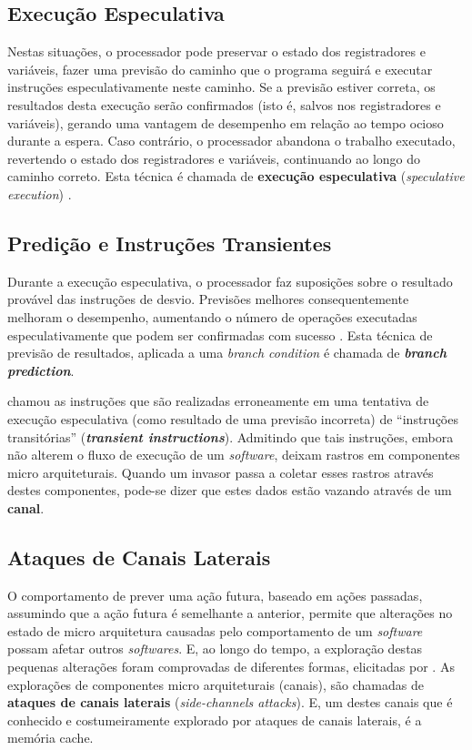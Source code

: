 \documentclass[conference]{IEEEtran}
\begin{document}
\subsection{Execução Especulativa}
Nestas situações, o processador pode preservar o estado dos registradores e variáveis, fazer uma previsão do caminho que o programa seguirá e executar instruções especulativamente neste caminho. Se a previsão estiver correta, os resultados desta execução serão confirmados (isto é, salvos nos registradores e variáveis), gerando uma vantagem de desempenho em relação ao tempo ocioso durante a espera. Caso contrário, o processador abandona o trabalho executado, revertendo o estado dos registradores e variáveis, continuando ao longo do caminho correto. Esta técnica é chamada de \textbf{execução especulativa} (\emph{speculative execution}) \cite{Kocher2018Spectre}.

\subsection{Predição e Instruções Transientes}
Durante a execução especulativa, o processador faz suposições sobre o resultado provável das instruções de desvio. Previsões melhores consequentemente melhoram o desempenho, aumentando o número de operações executadas especulativamente que podem ser confirmadas com sucesso \cite{Kocher2018Spectre}. Esta técnica de previsão de resultados, aplicada a uma \emph{branch condition} é chamada de \textbf{\emph{branch prediction}}.

 chamou as instruções que são realizadas erroneamente em uma tentativa de execução especulativa (como resultado de uma previsão incorreta) de ``instruções transitórias'' (\textbf{\emph{transient instructions}}). Admitindo que tais instruções, embora não alterem o fluxo de execução de um \emph{software}, deixam rastros em componentes micro arquiteturais. Quando um invasor passa a coletar esses rastros através destes componentes, pode-se dizer que estes dados estão vazando através de um \textbf{canal}.

\subsection{Ataques de Canais Laterais}
O comportamento de prever uma ação futura, baseado em ações passadas, assumindo que a ação futura é semelhante a anterior, permite que alterações no estado de micro arquitetura causadas pelo comportamento de um \emph{software} possam afetar outros \emph{softwares}. E, ao longo do tempo, a exploração destas pequenas alterações foram comprovadas de diferentes formas, elicitadas por . As explorações de componentes micro arquiteturais (canais), são chamadas de \textbf{ataques de canais laterais} (\emph{side-channels attacks}). E, um destes canais que é conhecido e costumeiramente explorado por ataques de canais laterais, é a memória cache.
\end{document}
